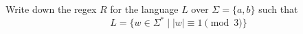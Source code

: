 Write down the regex $R$ for the language $L$ over $\Sigma = \{a, b\}$ 
such that 
\[
L = \{w \in \Sigma^* \mid |w| \equiv 1 \pmod{3} \}
\]

